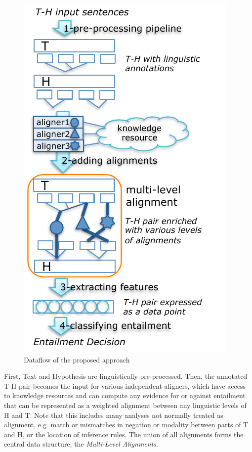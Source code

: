 \documentclass[11pt,letterpaper]{article}
\begin{document}
\begin{figure}[t!b]
  \centering
  \includegraphics[width=0.9\columnwidth]{figures/figure1.pdf}
  \caption{Dataflow of the proposed approach}
  \label{fig:1}
\end{figure}

First, Text and Hypothesis are linguistically pre-processed. Then, the
annotated T-H pair becomes the input for various independent aligners,
which have access to knowledge resources and can compute any evidence
for or against entailment that can be represented as a weighted
alignment between any linguistic levels of H and T. Note that this
includes many analyses not normally treated as alignment, e.g. match
or mismatches in negation or modality between parts of T and H, or the
location of inference rules. The union of all alignments forms the
central data structure, the {\em Multi-Level Alignments}.
\end{document}

